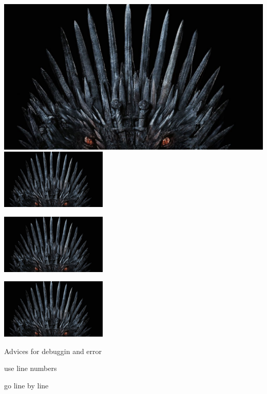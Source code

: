 \documentclass[11pt]{article}
\begin{document}
\includegraphics[scale=0.1]{iron_throne.jpg}
\includegraphics[width=2in]{iron_throne.jpg}\\
\begin{center}
\includegraphics[width=2in]{iron_throne.jpg}
\end{center}
\begin{center}
\includegraphics[width=2in,angle=45]{iron_throne.jpg}
\end{center}

\vspace{1in}
Advices for debuggin and error

use line numbers

go line by line
\end{document}
